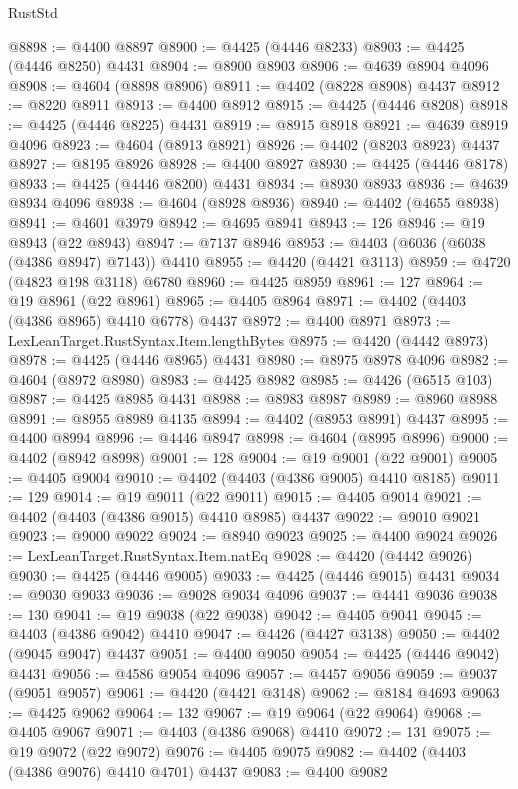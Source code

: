 \begin{lexlean}{RustStd}
\begin{coremodule}
@8898 := @4400 @8897
@8900 := @4425 (@4446 @8233)
@8903 := @4425 (@4446 @8250) @4431
@8904 := @8900 @8903
@8906 := @4639 @8904 @4096
@8908 := @4604 (@8898 @8906)
@8911 := @4402 (@8228 @8908) @4437
@8912 := @8220 @8911
@8913 := @4400 @8912
@8915 := @4425 (@4446 @8208)
@8918 := @4425 (@4446 @8225) @4431
@8919 := @8915 @8918
@8921 := @4639 @8919 @4096
@8923 := @4604 (@8913 @8921)
@8926 := @4402 (@8203 @8923) @4437
@8927 := @8195 @8926
@8928 := @4400 @8927
@8930 := @4425 (@4446 @8178)
@8933 := @4425 (@4446 @8200) @4431
@8934 := @8930 @8933
@8936 := @4639 @8934 @4096
@8938 := @4604 (@8928 @8936)
@8940 := @4402 (@4655 @8938)
@8941 := @4601 @3979
@8942 := @4695 @8941
@8943 := 126
@8946 := @19 @8943 (@22 @8943)
@8947 := @7137 @8946
@8953 := @4403 (@6036 (@6038 (@4386 @8947) @7143)) @4410
@8955 := @4420 (@4421 @3113)
@8959 := @4720 (@4823 @198 @3118) @6780
@8960 := @4425 @8959
@8961 := 127
@8964 := @19 @8961 (@22 @8961)
@8965 := @4405 @8964
@8971 := @4402 (@4403 (@4386 @8965) @4410 @6778) @4437
@8972 := @4400 @8971
@8973 := LexLeanTarget.RustSyntax.Item.lengthBytes
@8975 := @4420 (@4442 @8973)
@8978 := @4425 (@4446 @8965) @4431
@8980 := @8975 @8978 @4096
@8982 := @4604 (@8972 @8980)
@8983 := @4425 @8982
@8985 := @4426 (@6515 @103)
@8987 := @4425 @8985 @4431
@8988 := @8983 @8987
@8989 := @8960 @8988
@8991 := @8955 @8989 @4135
@8994 := @4402 (@8953 @8991) @4437
@8995 := @4400 @8994
@8996 := @4446 @8947
@8998 := @4604 (@8995 @8996)
@9000 := @4402 (@8942 @8998)
@9001 := 128
@9004 := @19 @9001 (@22 @9001)
@9005 := @4405 @9004
@9010 := @4402 (@4403 (@4386 @9005) @4410 @8185)
@9011 := 129
@9014 := @19 @9011 (@22 @9011)
@9015 := @4405 @9014
@9021 := @4402 (@4403 (@4386 @9015) @4410 @8985) @4437
@9022 := @9010 @9021
@9023 := @9000 @9022
@9024 := @8940 @9023
@9025 := @4400 @9024
@9026 := LexLeanTarget.RustSyntax.Item.natEq
@9028 := @4420 (@4442 @9026)
@9030 := @4425 (@4446 @9005)
@9033 := @4425 (@4446 @9015) @4431
@9034 := @9030 @9033
@9036 := @9028 @9034 @4096
@9037 := @4441 @9036
@9038 := 130
@9041 := @19 @9038 (@22 @9038)
@9042 := @4405 @9041
@9045 := @4403 (@4386 @9042) @4410
@9047 := @4426 (@4427 @3138)
@9050 := @4402 (@9045 @9047) @4437
@9051 := @4400 @9050
@9054 := @4425 (@4446 @9042) @4431
@9056 := @4586 @9054 @4096
@9057 := @4457 @9056
@9059 := @9037 (@9051 @9057)
@9061 := @4420 (@4421 @3148)
@9062 := @8184 @4693
@9063 := @4425 @9062
@9064 := 132
@9067 := @19 @9064 (@22 @9064)
@9068 := @4405 @9067
@9071 := @4403 (@4386 @9068) @4410
@9072 := 131
@9075 := @19 @9072 (@22 @9072)
@9076 := @4405 @9075
@9082 := @4402 (@4403 (@4386 @9076) @4410 @4701) @4437
@9083 := @4400 @9082

\end{coremodule}
\end{lexlean}
